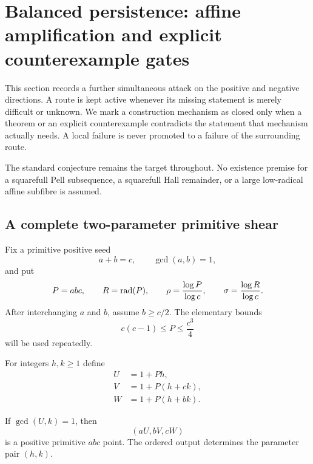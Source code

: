 \section{Balanced persistence: affine amplification and explicit counterexample gates}
\label{sec:balanced-persistence}

This section records a further simultaneous attack on the positive and
negative directions.  A route is kept active whenever its missing statement
is merely difficult or unknown.  We mark a construction mechanism as closed
only when a theorem or an explicit counterexample contradicts the statement
that mechanism actually needs.  A local failure is never promoted to a
failure of the surrounding route.

The standard conjecture remains the target throughout.  No existence premise
for a squarefull Pell subsequence, a squarefull Hall remainder, or a large
low-radical affine subfibre is assumed.

\subsection{A complete two-parameter primitive shear}

Fix a primitive positive seed
\[
             a+b=c,\qquad \gcd(a,b)=1,
\]
and put
\[
 P=abc,\qquad R=\operatorname{rad}(P),\qquad
 \rho=\frac{\log P}{\log c},\qquad
 \sigma=\frac{\log R}{\log c}.
\]
After interchanging $a$ and $b$, assume $b\geq c/2$.  The elementary bounds
\begin{equation}\label{eq:bp-P-range}
                  c(c-1)\leq P\leq \frac{c^3}{4}
\end{equation}
will be used repeatedly.

For integers $h,k\geq1$ define
\begin{equation}\label{eq:bp-shear}
 \begin{split}
 U&=1+Ph,\\
 V&=1+P(h+ck),\\
 W&=1+P(h+bk).
 \end{split}
\end{equation}

\begin{theorem}
\label{thm:bp-affine-shear}
If $\gcd(U,k)=1$, then
\[
                         (aU,bV,cW)
\]
is a positive primitive $abc$ point.  The ordered output determines the
parameter pair $(h,k)$.
\end{theorem}

